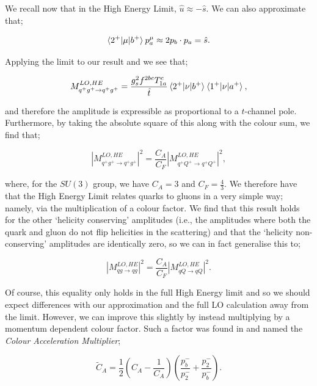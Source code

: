 We recall now that in the High Energy Limit, $\hat{u} \approx -\hat{s}$. We can also approximate that;

\begin{equation}
\mathinner{\langle2^+\vert\mu\vert b^+\rangle}_{} p_a^\mu \approx 2 p_b \cdot p_a  = \hat{s}.\end{equation}

Applying the limit to our result and we see that; 

\begin{equation}
M_{q^+g^+ \to q^+g^+}^{LO, HE} = \frac{g_s^2 f^{2bc}T^c_{1a}}{\hat{t}}\mathinner{\langle2^+\vert\nu\vert b^+\rangle}_{} \mathinner{\langle1^+\vert\nu\vert a^+\rangle}_{},
\end{equation}

and therefore the amplitude is expressible as proportional to a $t$-channel pole. Furthermore, by taking the absolute square of this along with the colour sum, we find that;

\begin{equation}
|M_{q^+g^+ \to q^+g^+}^{LO, HE}|^2 = \frac{C_A}{C_F} |M_{q^+Q^+ \to q^+Q^+}^{LO, HE}|^2,
\end{equation}

where, for the $SU(3)$ group, we have $C_A = 3$ and $C_F = \frac{4}{3}$. We therefore have that the High Energy Limit relates quarks to gluons in a very simple way; namely, via the multiplication of a colour factor. We find that this result holds for the other `helicity conserving' amplitudes (i.e., the amplitudes where both the quark and gluon do not flip helicities in the scattering) and that the `helicity non-conserving' amplitudes are identically zero, so we can in fact generalise this to;

\begin{equation}
|M_{qg \to qg}^{LO, HE}|^2 = \frac{C_A}{C_F} |M_{qQ \to qQ}^{LO, HE}|^2.
\end{equation}

Of course, this equality only holds in the full High Energy limit and so we should expect differences with our approximation and the full LO calculation away from the limit. However, we can improve this slightly by instead multiplying by a momentum dependent colour factor. Such a factor was found in \cite{Andersen2010} and named the \emph{Colour Acceleration Multiplier};

\begin{equation}
\tilde{C}_A = \frac{1}{2} \left(C_A - \frac{1}{C_A} \right) \left(\frac{p_b^-}{p_2^-} + \frac{p_2^-}{p_b^-} \right).
\end{equation}

